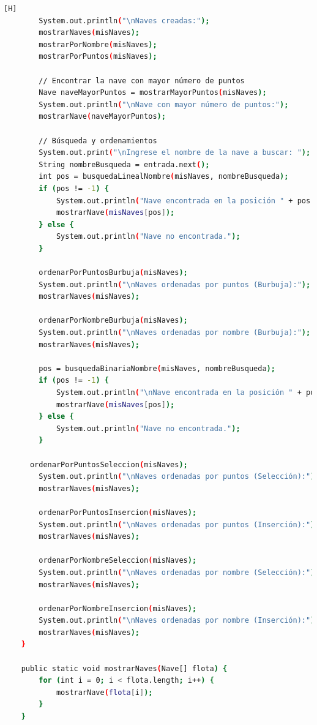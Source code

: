 \documentclass{article}
\begin{document}
\begin{lstlisting}[language=bash,caption={Creando la clase Ejercito_vs}][H]
        System.out.println("\nNaves creadas:");
        mostrarNaves(misNaves);
        mostrarPorNombre(misNaves);
        mostrarPorPuntos(misNaves);

        // Encontrar la nave con mayor número de puntos
        Nave naveMayorPuntos = mostrarMayorPuntos(misNaves);
        System.out.println("\nNave con mayor número de puntos:");
        mostrarNave(naveMayorPuntos);

        // Búsqueda y ordenamientos
        System.out.print("\nIngrese el nombre de la nave a buscar: ");
        String nombreBusqueda = entrada.next();
        int pos = busquedaLinealNombre(misNaves, nombreBusqueda);
        if (pos != -1) {
            System.out.println("Nave encontrada en la posición " + pos + ":");
            mostrarNave(misNaves[pos]);
        } else {
            System.out.println("Nave no encontrada.");
        }

        ordenarPorPuntosBurbuja(misNaves);
        System.out.println("\nNaves ordenadas por puntos (Burbuja):");
        mostrarNaves(misNaves);

        ordenarPorNombreBurbuja(misNaves);
        System.out.println("\nNaves ordenadas por nombre (Burbuja):");
        mostrarNaves(misNaves);

        pos = busquedaBinariaNombre(misNaves, nombreBusqueda);
        if (pos != -1) {
            System.out.println("\nNave encontrada en la posición " + pos + ":");
            mostrarNave(misNaves[pos]);
        } else {
            System.out.println("Nave no encontrada.");
        }

      ordenarPorPuntosSeleccion(misNaves);
        System.out.println("\nNaves ordenadas por puntos (Selección):");
        mostrarNaves(misNaves);

        ordenarPorPuntosInsercion(misNaves);
        System.out.println("\nNaves ordenadas por puntos (Inserción):");
        mostrarNaves(misNaves);

        ordenarPorNombreSeleccion(misNaves);
        System.out.println("\nNaves ordenadas por nombre (Selección):");
        mostrarNaves(misNaves);

        ordenarPorNombreInsercion(misNaves);
        System.out.println("\nNaves ordenadas por nombre (Inserción):");
        mostrarNaves(misNaves);
    }

    public static void mostrarNaves(Nave[] flota) {
        for (int i = 0; i < flota.length; i++) {
            mostrarNave(flota[i]);
        }
    }


\end{lstlisting}
\end{document}
